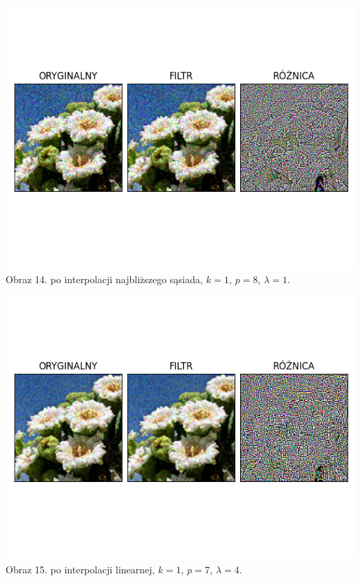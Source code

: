 \documentclass[14pt]{article}
\begin{document}
\begin{center}
    \includegraphics[scale=0.7]{images/keys_poisson1x_k1_p8.png}
    \\ \small Obraz 14. po interpolacji najbliższego sąsiada, 
    $k=1$, $p=8$, $\lambda=1$.

    \includegraphics[scale=0.7]{images/keys_poisson4x_k1_p7.png}
    \\ \small Obraz 15. po interpolacji linearnej, 
    $k=1$, $p=7$, $\lambda=4$.


\end{center}
\end{document}
